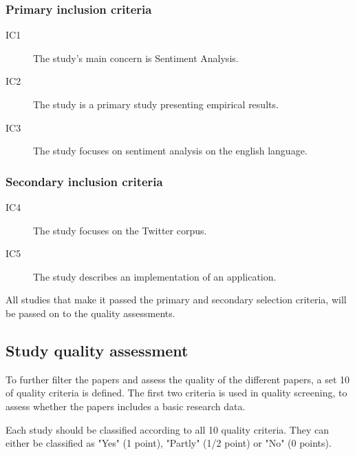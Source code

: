 \subsubsection{Primary inclusion criteria}

\begin{description}

\item[IC1] The study’s main concern is Sentiment Analysis.
\item[IC2] The study is a primary study presenting empirical results.
\item[IC3] The study focuses on sentiment analysis on the english language.

\end{description}

\subsubsection{Secondary inclusion criteria}

\begin{description}


\item[IC4] The study focuses on the Twitter corpus.
\item[IC5] The study describes an implementation of an application.

\end{description}

All studies that make it passed the primary and secondary selection criteria, will be passed on to the quality assessments. 

\subsection{Study quality assessment}

To further filter the papers and assess the quality of the different papers, a set 10 of quality criteria is defined. The first two criteria is used in quality screening, to assess whether the papers includes a basic research data.

Each study should be classified according to all 10 quality criteria. They can either be classified as "Yes" (1 point), "Partly" (1/2 point) or "No" (0 points).

